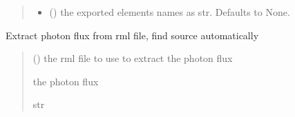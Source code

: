 \documentclass[letterpaper,10pt,english]{sphinxmanual}
\begin{document}
\begin{fulllineitems}
\begin{fulllineitems}
\begin{quote}
\begin{description}
\begin{itemize}
\item {} 
\sphinxAtStartPar
{} (\sphinxstyleliteralemphasis{\sphinxupquote{, }}) \textendash{} the exported elements names as str. Defaults to None.

\end{itemize}

\end{description}\end{quote}

\end{fulllineitems}


\begin{fulllineitems}
\label{\detokenize{API:raypyng.postprocessing.PostProcess.extract_nrays_from_source}}
\pysigstartsignatures
{}
\pysigstopsignatures
\sphinxAtStartPar
Extract photon flux from rml file, find source automatically
\begin{quote}\begin{description}
\sphinxAtStartPar
{} () \textendash{} the rml file to use to extract the photon flux

\sphinxAtStartPar
the photon flux

\sphinxAtStartPar
str

\end{description}\end{quote}

\end{fulllineitems}



\end{fulllineitems}
\end{document}
